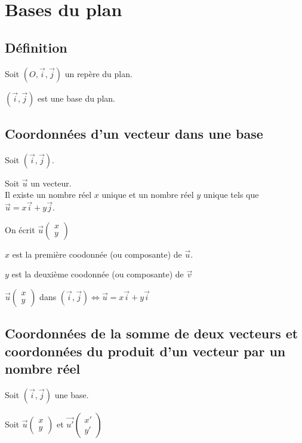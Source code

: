 \ifdefined\COMPLETE
\else
    
    
\fi



\section{Bases du plan}

\subsection{Définition}

Soit $\left(O, \vec{i}, \vec{j}\right)$ un repère du plan.

$\left(\vec{i}, \vec{j}\right)$ est une base du plan.

\subsection{Coordonnées d'un vecteur dans une base}

Soit $\left(\vec{i}, \vec{j}\right)$.

Soit $\vec{u}$ un vecteur. \\

Il existe un nombre réel $x$ unique et un nombre réel $y$ unique tels que $\vec{u} = x\vec{i} + y\vec{j}$.

On écrit $\vec{u}\left(\begin{array}{c} x\\ y \end{array}\right)$

$x$ est la première coodonnée (ou composante) de $\vec{u}$.

$ y$ est la deuxième coodonnée (ou composante) de $\vec{v}$

$\vec{u}\left(\begin{array}{c} x\\ y \end{array}\right)$ dans $\left(\vec{i}, \vec{j}\right) \Longleftrightarrow \vec{u} = x\vec{i} + y\vec{i}$

\subsection{Coordonnées de la somme de deux vecteurs et coordonnées du produit d'un vecteur par un nombre réel}

Soit $\left(\vec{i}, \vec{j}\right)$ une base.

Soit $\vec{u}\left(\begin{array}{c} x\\ y \end{array}\right)$ et $\overrightarrow{u'}\left(\begin{array}{c} x'\\ y' \end{array}\right)$

